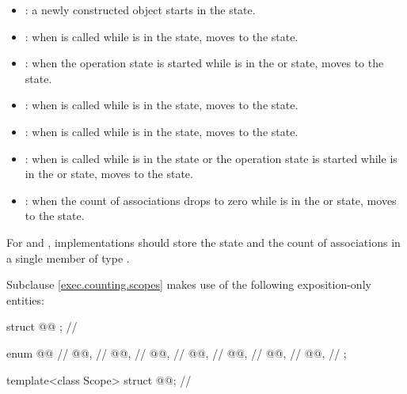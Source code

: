 \begin{itemize}
\item
{}:
a newly constructed object starts in the  state.

\item
{}:
when  is called
while  is in the  state,
 moves to the  state.

\item
{}:
when the operation state  is started
while  is in the  or  state,
 moves to the  state.

\item
{}:
when  is called
while  is in the  state,
 moves to the  state.

\item
{}:
when  is called
while  is in the  state,
 moves to the  state.

\item
{}:
when  is called
while  is in the  state or
the operation state  is started
while  is in
the  or  state,
 moves to the  state.

\item
{}:
when the count of associations drops to zero
while  is in
the  or  state,
 moves to the  state.
\end{itemize}

\pnum
\recommended
For  and ,
implementations should store the state and the count of associations
in a single member of type .

\pnum
Subclause \ref{exec.counting.scopes} makes use of
the following exposition-only entities:

\begin{codeblock}
struct @@ {};     // \expos

enum @@ {     // \expos
  @@,                   // \expos
  @@,                     // \expos
  @@,                   // \expos
  @@,         // \expos
  @@,       // \expos
  @@,        // \expos
  @@,                   // \expos
};

template<class Scope>
  struct @@;     // \expos
\end{codeblock}


